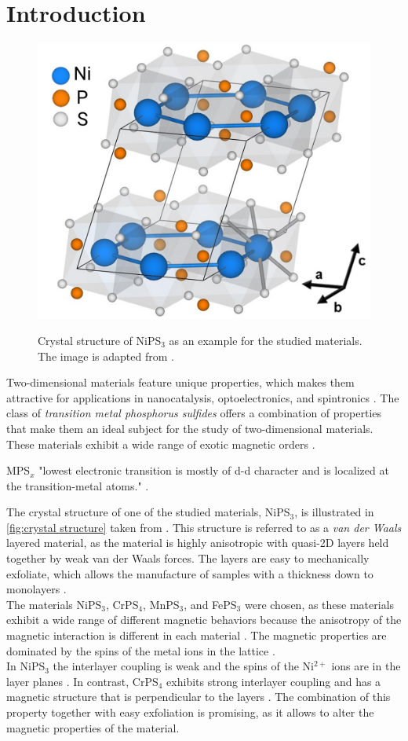 \documentclass[
	oneside,
	parskip=half,
	a4paper,
]{scrbook}
\begin{document}
\cleardoublepage
{
	\sffamily
	\hypersetup{hidelinks}
	\tableofcontents
}

\mainmatter

\chapter{Introduction}
\begin{figure}
	\includegraphics[width=.4\textwidth]{../../figures/crystal structures/NiPS3 3d.png}\\
	\caption{}
	Crystal structure of NiPS$_3$ as an example for the studied materials.
	The image is adapted from \cite{NiPS3_coherent}.
	\label{fig:crystal structure}
\end{figure}
Two-dimensional materials feature unique properties, which makes them attractive for applications in nanocatalysis, optoelectronics, and spintronics \cite{MPX_review}.
The class of \textit{transition metal phosphorus sulfides} offers a combination of properties that make them an ideal subject for the study of two-dimensional materials.
These materials exhibit a wide range of exotic magnetic orders \cite{AFM_review}.

MPS$_x$ "lowest electronic transition is mostly of d-d character and is localized at the transition-metal atoms." \cite{CrPS4_pl}.

The crystal structure of one of the studied materials, NiPS$_3$, is illustrated in \autoref{fig:crystal structure} taken from \cite{NiPS3_coherent}.
This structure is referred to as a \textit{van der Waals} layered material, as the material is highly anisotropic with quasi-2D layers held together by weak van der Waals forces.
The layers are easy to mechanically exfoliate, which allows the manufacture of samples with a thickness down to monolayers \cite{NiPS3_few_layer}.\\
The materials NiPS$_3$, CrPS$_4$, MnPS$_3$, and FePS$_3$ were chosen,  
as these materials exhibit a wide range of different magnetic behaviors because the anisotropy of the magnetic interaction is different in each material \cite{MPS_magnetism,CrPS4_magnetic}.
The magnetic properties are dominated by the spins of the metal ions in the lattice \cite{MPS_magnetism, NiPS3_magnon_gap, CrPS4_magnetic}.\\
In NiPS$_3$ the interlayer coupling is weak and the spins of the Ni$^{2+}$ ions are in the layer planes \cite{MPS_magnetism}.
In contrast, CrPS$_4$ exhibits strong interlayer coupling and has a magnetic structure that is perpendicular to the layers \cite{CrPS4_magnetic}.
The combination of this property together with easy exfoliation is promising, as it allows to alter the magnetic properties of the material.
\end{document}
